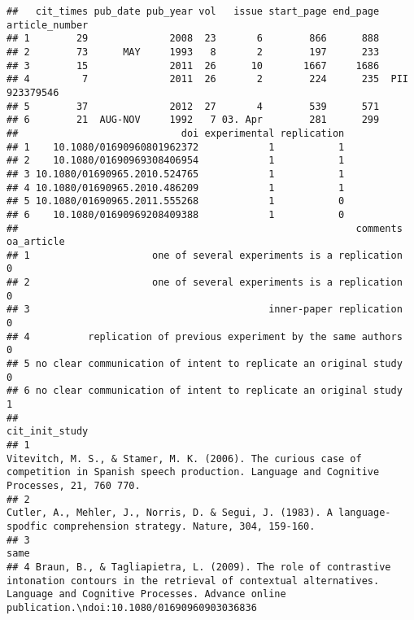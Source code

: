 \documentclass[cm]{glossa}
\begin{document}
\begin{verbatim}
##   cit_times pub_date pub_year vol   issue start_page end_page article_number
## 1        29              2008  23       6        866      888               
## 2        73      MAY     1993   8       2        197      233               
## 3        15              2011  26      10       1667     1686               
## 4         7              2011  26       2        224      235  PII 923379546
## 5        37              2012  27       4        539      571               
## 6        21  AUG-NOV     1992   7 03. Apr        281      299               
##                            doi experimental replication
## 1    10.1080/01690960801962372            1           1
## 2    10.1080/01690969308406954            1           1
## 3 10.1080/01690965.2010.524765            1           1
## 4 10.1080/01690965.2010.486209            1           1
## 5 10.1080/01690965.2011.555268            1           0
## 6    10.1080/01690969208409388            1           0
##                                                          comments oa_article
## 1                     one of several experiments is a replication          0
## 2                     one of several experiments is a replication          0
## 3                                         inner-paper replication          0
## 4          replication of previous experiment by the same authors          0
## 5 no clear communication of intent to replicate an original study          0
## 6 no clear communication of intent to replicate an original study          1
##                                                                                                                                                                                                                cit_init_study
## 1                                                                      Vitevitch, M. S., & Stamer, M. K. (2006). The curious case of competition in Spanish speech production. Language and Cognitive Processes, 21, 760 770.
## 2                                                                                                     Cutler, A., Mehler, J., Norris, D. & Segui, J. (1983). A language-spodfic comprehension strategy. Nature, 304, 159-160.
## 3                                                                                                                                                                                                                        same
## 4 Braun, B., & Tagliapietra, L. (2009). The role of contrastive intonation contours in the retrieval of contextual alternatives. Language and Cognitive Processes. Advance online publication.\ndoi:10.1080/01690960903036836

\end{verbatim}
\end{document}
